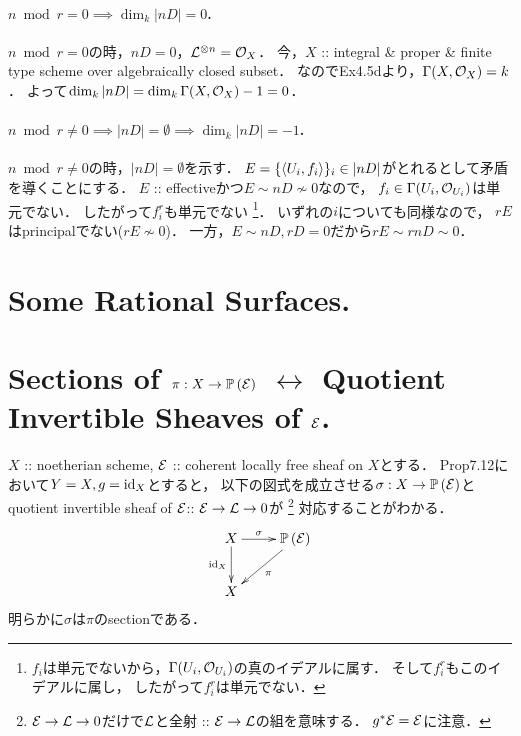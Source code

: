 \documentclass[a4paper]{jsarticle}
\newcommand{\pbundle}{\mathbb{P}\,}
\begin{document}
    \paragraph{$n \bmod r=0 \implies \dim_k |nD|=0$.}
    $n \bmod r=0$の時，$nD=0$，$\mathcal{L}^{\otimes n}=\mathcal{O}_X$．
    今，$X$ :: integral \& proper \& finite type scheme over algebraically closed subset．
    なのでEx4.5dより，$\Gamma(X, \mathcal{O}_X)=k$．
    よって$\dim_k |nD|=\dim_k \Gamma(X, \mathcal{O}_X)-1=0$．

    \paragraph{$n \bmod r \neq 0 \implies |nD|=\emptyset \implies \dim_k |nD|=-1$.}
    $n \bmod r \neq 0$の時，$|nD|=\emptyset$を示す．
    $E=\{\langle U_i,f_i \rangle\}_i \in |nD|$がとれるとして矛盾を導くことにする．
    $E$ :: effectiveかつ$E \sim nD \not \sim 0$なので，
    $f_i \in \Gamma(U_i, \mathcal{O}_{U_i})$は単元でない．
    したがって$f_i^r$も単元でない
    \footnote
    {
        $f_i$は単元でないから，$\Gamma(U_i, \mathcal{O}_{U_i})$の真のイデアルに属す．
        そして$f_i^r$もこのイデアルに属し，
        したがって$f_i^r$は単元でない．
    }．
    いずれの$i$についても同様なので，
    $rE$はprincipalでない($rE \not \sim 0$)．
    一方，$E \sim nD, rD=0$だから$rE \sim rnD \sim 0$．

\section{Some Rational Surfaces.} %

\section{Sections of $\pi: X \to \pbundle(\shE)$
    $\leftrightarrow$ Quotient Invertible Sheaves of $\mathcal{E}$.} %

    $X$ :: noetherian scheme,
    $\mathcal{E}$ :: coherent locally free sheaf on $X$とする．
    Prop7.12において$Y=X, g=\mathrm{id}_{X}$とすると，
    以下の図式を成立させる$\sigma: X \to \pbundle(\shE)$と
    quotient invertible sheaf of $\mathcal{E} $:: $\mathcal{E} \to \mathcal{L} \to 0$が
    \footnote
    {
        $\mathcal{E} \to \mathcal{L} \to 0$だけで$\mathcal{L}$と全射 :: $\mathcal{E} \to \mathcal{L}$の組を意味する．
        $g^*\mathcal{E}=\mathcal{E}$に注意．
    }
    対応することがわかる．
    \[
        \xymatrix
        {
            X \ar[r]^-{\sigma}\ar[d]_-{\id{X}}& \pbundle(\shE) \ar[ld]^-{\pi} \\
            X
        }
    \]
    明らかに$\sigma$は$\pi$のsectionである．
    
\end{document}
